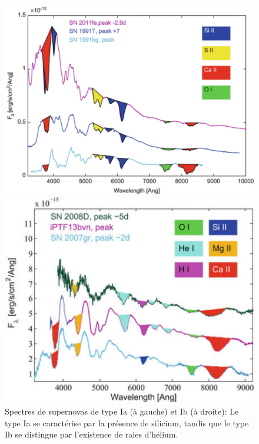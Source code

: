 \begin{figure}[H]
	\begin{minipage}[width=5cm]{.46\linewidth}
		\includegraphics[scale=0.40]{images/1a}
	\end{minipage} \hfill
	\begin{minipage}[width=5cm]{.46\linewidth}
		\includegraphics[scale=0.50]{images/1b}
	\end{minipage}
	\caption[Spectres de supernovas de type Ia et Ib]{Spectres de supernovas de type Ia (à gauche) et Ib (à droite): Le type Ia se caractérise par la présence de silicium, tandis que le type Ib se distingue par l'existence de raies d'hélium.}
\end{figure}

